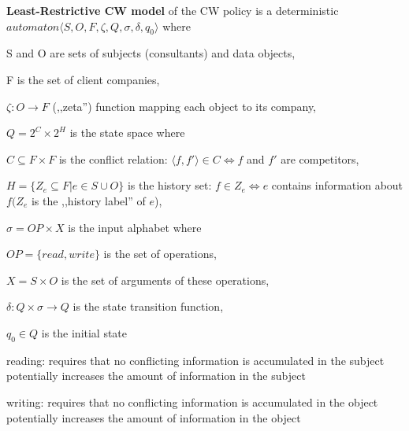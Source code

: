 \documentclass[a4paper]{article}
\renewcommand{\note}[2]{\begin{noteBox} \textbf{#1} #2 \end{noteBox}}
\begin{document}
\begin{multicols}{3}
    \note{Least-Restrictive CW model}{ of the CW policy is a deterministic $automaton \langle S,O,F,\zeta,Q,\sigma,\delta,q_0\rangle$ where
        \begin{itemize*}
            \item S and O are sets of subjects (consultants) and data objects,
            \item F is the set of client companies,
            \item $\zeta:O\rightarrow F$ (,,zeta'') function mapping each object to its company,
            \item $Q=2^C \times 2^H$ is the state space where
            \begin{itemize*}
                \item $C\subseteq F\times F$ is the conflict relation: $\langle f,f'\rangle \in C\Leftrightarrow f$ and $f'$ are competitors,
                \item $H=\{Z_e\subseteq F|e\in S\cup O\}$ is the history set: $f\in Z_e\Leftrightarrow e$ contains information about $f(Z_e$ is the ,,history label'' of $e$),
            \end{itemize*}
            \item $\sigma=OP\times X$ is the input alphabet where
            \begin{itemize*}
                \item $OP=\{read,write\}$ is the set of operations,
                \item $X=S\times O$ is the set of arguments of these operations,
            \end{itemize*}
            \item $\delta:Q\times\sigma\rightarrow Q$ is the state transition function,
            \item $q_0\in Q$ is the initial state
        \end{itemize*}
    }

    \begin{itemize*}
        \item reading: requires that no conflicting information is accumulated in the subject potentially increases the amount of information in the subject
        \item writing: requires that no conflicting information is accumulated in the object potentially increases the amount of information in the object
    \end{itemize*}


\end{multicols}
\end{document}
